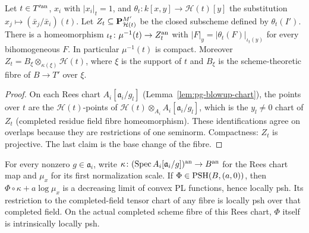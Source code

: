 \begin{lemma}\label{lem:fc-fibre-model}
\notready
{}
Let $t\in T'^{\mathrm{an}}$, $x_i$ with $|x_i|_t=1$, and $\theta_t\colon k[x,y]\to\mathcal H(t)[y]$ the substitution
$x_j\mapsto(\bar x_j/\bar x_i)(t)$. Let $Z_t\subseteq\mathbf{P}^{M'}_{\mathcal H(t)}$ be the closed subscheme defined by
$\theta_t(I')$. There is a homeomorphism $\iota_t\colon\mu^{-1}(t)\to Z_t^{\mathrm{an}}$ with $|F|_y=|\theta_t(F)|_{\iota_t(y)}$ for every
bihomogeneous $F$. In particular $\mu^{-1}(t)$ is compact. Moreover $Z_t=B_\xi\otimes_{\kappa(\xi)}\mathcal H(t)$, where $\xi$
is the support of $t$ and $B_\xi$ is the scheme-theoretic fibre of $B\to T'$ over $\xi$.
\end{lemma}

\begin{proof}
On each Rees chart $A_i[\mathfrak a_i/g_l]$ (Lemma~\ref{lem:pg-blowup-chart}), the points over $t$ are the
$\mathcal H(t)$-points of $\mathcal H(t)\otimes_{A_i}A_i[\mathfrak a_i/g_l]$, which is the $y_l\ne0$ chart of $Z_t$ (completed
residue field fibre homeomorphism). These identifications agree on overlaps because they are restrictions of one
seminorm. Compactness: $Z_t$ is projective. The last claim is the base change of the fibre.
\end{proof}

\begin{lemma}\label{lem:fc-chart-psh}
\leanok
{}
For every nonzero $g\in\mathfrak a_i$, write $\kappa\colon(\operatorname{Spec} A_i[\mathfrak a_i/g])^{\mathrm{an}}\to B^{\mathrm{an}}$ for the Rees
chart map and $\mu_x$ for its first normalization scale. If $\Phi\in\operatorname{PSH}(B,(a,0))$, then
$\Phi\circ\kappa+a\log\mu_x$ is a decreasing limit of convex PL functions, hence locally psh.
Its restriction to the completed-field tensor chart of any fibre is locally psh over that completed field.
On the actual completed scheme fibre of this Rees chart, $\Phi$ itself is intrinsically locally psh.
\end{lemma}


